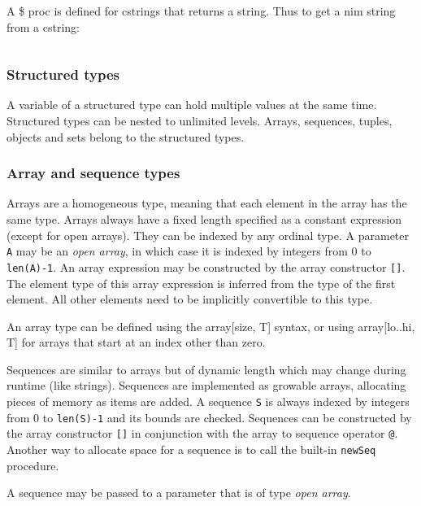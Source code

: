 A {\$} proc is defined for cstrings that returns a string. Thus to get a
nim string from a cstring:

\begin{verbatim}
\end{verbatim}

\hypertarget{structured-types}{%
\subsubsection{Structured types}\label{structured-types}}

A variable of a structured type can hold multiple values at the same
time. Structured types can be nested to unlimited levels. Arrays,
sequences, tuples, objects and sets belong to the structured types.

\hypertarget{array-and-sequence-types}{%
\subsubsection{Array and sequence
types}\label{array-and-sequence-types}}

Arrays are a homogeneous type, meaning that each element in the array
has the same type. Arrays always have a fixed length specified as a
constant expression (except for open arrays). They can be indexed by any
ordinal type. A parameter \texttt{A} may be an \emph{open array}, in
which case it is indexed by integers from 0 to \texttt{len(A)-1}. An
array expression may be constructed by the array constructor
\texttt{{[}{]}}. The element type of this array expression is inferred
from the type of the first element. All other elements need to be
implicitly convertible to this type.

An array type can be defined using the {array{[}size, T{]}} syntax, or
using {array{[}lo..hi, T{]}} for arrays that start at an index other
than zero.

Sequences are similar to arrays but of dynamic length which may change
during runtime (like strings). Sequences are implemented as growable
arrays, allocating pieces of memory as items are added. A sequence
\texttt{S} is always indexed by integers from 0 to \texttt{len(S)-1} and
its bounds are checked. Sequences can be constructed by the array
constructor \texttt{{[}{]}} in conjunction with the array to sequence
operator \texttt{@}. Another way to allocate space for a sequence is to
call the built-in \texttt{newSeq} procedure.

A sequence may be passed to a parameter that is of type \emph{open
array}.


